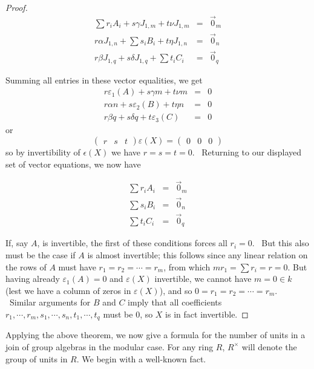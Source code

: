 \documentclass[12pt, a4paper]{amsart}
\numberwithin{equation}{section} %
\theoremstyle{plain}
\theoremstyle{definition}
\theoremstyle{plain}
\theoremstyle{remark}
\begin{document}
\begin{proof}
\begin{eqnarray*}
\sum r_{i}A_{i}+s\gamma J_{1,m}+t\nu J_{1,m} &=&\overrightarrow{0}%
_{m} \\
r\alpha J_{1,n}+\sum s_{i}B_{i}+t\eta J_{1,n} &=&\overrightarrow{0}_{n} \\
r\beta J_{1,q}+s\delta J_{1,q}+\sum t_{i}C_{i} &=&\overrightarrow{0}_{q}
\end{eqnarray*}

Summing all entries in these vector equalities, we get%
\begin{eqnarray*}
r\varepsilon_1(A)+s\gamma m+t\nu m &=&0 \\
r\alpha n+s\varepsilon_2(B)+t\eta n &=&0 \\
r\beta q+s\delta q+t\varepsilon_3(C) &=&0
\end{eqnarray*}
or 
\[
\left( 
\begin{array}{lll}
r & s & t%
\end{array}%
\right) \varepsilon(X)=\left( 
\begin{array}{lll}
0 & 0 & 0%
\end{array}%
\right) 
\]%
so by invertibility of $\epsilon(X)$ we have $r=s=t=0$. \ Returning to our
displayed set of vector equations, we now have

\bigskip 
\begin{eqnarray*}
\sum r_{i}A_{i} &=&\overrightarrow{0}_{m} \\
\sum s_{i}B_{i} &=&\overrightarrow{0}_{n} \\
\sum t_{i}C_{i} &=&\overrightarrow{0}_{q}
\end{eqnarray*}

If, say $A$, is invertible, the first of these conditions forces all $r_{i}=0
$. \ But this also must be the case if $A$ is almost invertible; this
follows since any linear relation on the rows of $A$ must have $%
r_{1}=r_{2}=\cdots =r_{m}$, from which $mr_{1}=\sum r_{i}=r=0$.  But having already $\varepsilon_1(A)=0$ and $\varepsilon(X)$ invertible, 
we cannot have $m=0\in k$ (lest we have a column of zeros in $\varepsilon(X)$), and so $0=r_{1}=r_{2}=\cdots =r_{m}$. \
Similar arguments for $B$ and $C$ imply that all coefficients $r_{1},\cdots
,r_{m},s_{1},\cdots ,s_{n},t_{1},\cdots ,t_{q}$ must be $0$, so $X$ is in
fact invertible. \end{proof}

Applying the above theorem, we  now give a formula for the number of units in a join of  group algebras in the modular case. For any ring $R$, $R^\times$ will denote the group of units in $R$. We begin with a well-known fact.
\end{document}
